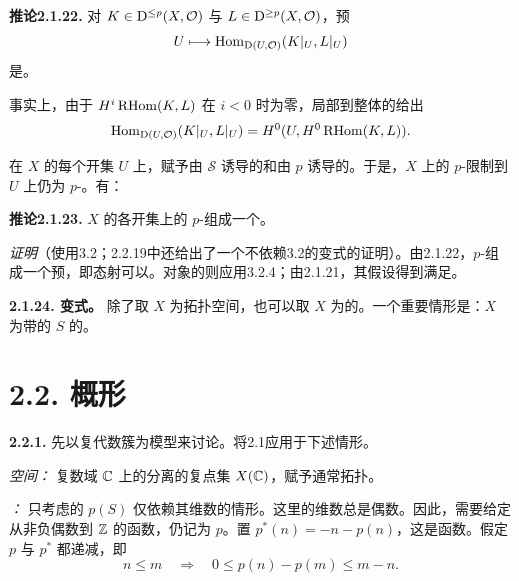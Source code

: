 \par\medskip\noindent\textbf{推论2.1.22.} 对 $K\in\mathrm{D}^{\leq p}(X,\mathcal O)$ 与 $L\in\mathrm{D}^{\geq p}(X,\mathcal O)$，预\[U\longmapsto\operatorname{Hom}_{\mathrm{D}(U,\mathcal O)}(K|_U,L|_U)\]是。

事实上，由于 $H^i\operatorname{RHom}(K,L)$ 在 $i<0$ 时为零，局部到整体的给出
\[
 \operatorname{Hom}_{\mathrm{D}(U,\mathcal O)}(K|_U,L|_U)=H^0(U,H^0\operatorname{RHom}(K,L)).
\]

在 $X$ 的每个开集 $U$ 上，赋予由 $\mathcal S$ 诱导的和由 $p$ 诱导的。于是，$X$ 上的 $p$-限制到 $U$ 上仍为 $p$-。有：

\par\medskip\noindent\textbf{推论2.1.23.} $X$ 的各开集上的 $p$-组成一个。

\emph{证明}（使用3.2；2.2.19中还给出了一个不依赖3.2的变式的证明）。由2.1.22，$p$-组成一个预，即态射可以。对象的则应用3.2.4；由2.1.21，其假设得到满足。

\par\medskip\noindent\textbf{2.1.24. 变式。} 除了取 $X$ 为拓扑空间，也可以取 $X$ 为的。一个重要情形是：$X$ 为带的 $S$ 的。

\section*{2.2. 概形}

\par\medskip\noindent\textbf{2.2.1.} 先以复代数簇为模型来讨论。将2.1应用于下述情形。

\emph{空间：} 复数域 $\mathbb C$ 上的分离的复点集 $X(\mathbb C)$，赋予通常拓扑。

\emph{：} 只考虑的 $p(S)$ 仅依赖其维数的情形。这里的维数总是偶数。因此，需要给定从非负偶数到 $\mathbb Z$ 的函数，仍记为 $p$。置 $p^*(n)=-n-p(n)$，这是函数。假定 $p$ 与 $p^*$ 都递减，即
\[
 n\leq m\quad\Longrightarrow\quad0\leq p(n)-p(m)\leq m-n.
\]


